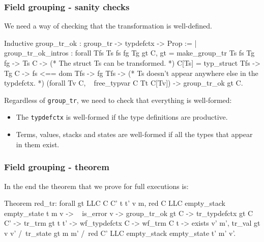 \begin{frame}[fragile]
\frametitle{Field grouping - sanity checks}

We need a way of checking that the transformation is well-defined.

\begin{coqs}
  Inductive group_tr_ok : group_tr -> typdefctx -> Prop :=
    | group_tr_ok_intros : forall Tfs Ts fs fg Tg gt C,
        gt = make_group_tr Ts fs Tg fg ->
        Ts \indom C ->
        (* The struct Ts can be transformed. *)
        C[Ts] = typ_struct Tfs ->
        Tg \notindom C ->
        fs <== dom Tfs ->
        fg \notindom Tfs ->
        (* Ts doesn't appear anywhere else in the typdefctx. *)
        (forall Tv \indom C, ~ free_typvar C Tt C[Tv]) ->
        group_tr_ok gt C.
\end{coqs}

\bigskip \pause

Regardless of \texttt{group\_tr}, we need to check that everything is well-formed:
\begin{itemize}
	\item The \texttt{typdefctx} is well-formed if the type definitions are productive. \pause
	\item Terms, values, stacks and states are well-formed if all the types that appear in them exist.
\end{itemize}

\end{frame}


\begin{frame}[fragile]
\frametitle{Field grouping - theorem}

In the end the theorem that we prove for full executions is:

\begin{coq}
  Theorem red_tr: forall gt LLC C C' t t' v m,
    red C LLC empty_stack empty_state t m v ->
    ~ is_error v ->
    group_tr_ok gt C ->
    tr_typdefctx gt C C' ->
    tr_trm gt t t' ->
    wf_typdefctx C ->
    wf_trm C t ->
    exists v' m',		tr_val gt v v'
	  	   /\ tr_state gt m m'
		   /\ red C' LLC empty_stack empty_state t' m' v'.
\end{coq}

\end{frame}


